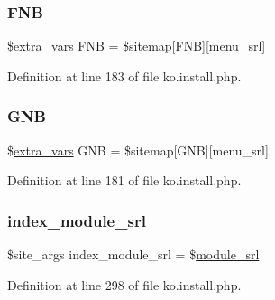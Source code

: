 \subsubsection{\texorpdfstring{F\+NB}{FNB}}
{\footnotesize\ttfamily \$\hyperlink{ko_8install_8php_ae1dcb37fc34a8f312d2e6abd6f806743}{extra\+\_\+vars} F\+NB = \$sitemap\mbox{[}\textquotesingle{}F\+NB\textquotesingle{}\mbox{]}\mbox{[}\textquotesingle{}menu\+\_\+srl\textquotesingle{}\mbox{]}}



Definition at line 183 of file ko.\+install.\+php.

\mbox{\label{ko_8install_8php_a9b1716b68fc04f3492448f38148dcbf5}} 
\subsubsection{\texorpdfstring{G\+NB}{GNB}}
{\footnotesize\ttfamily \$\hyperlink{ko_8install_8php_ae1dcb37fc34a8f312d2e6abd6f806743}{extra\+\_\+vars} G\+NB = \$sitemap\mbox{[}\textquotesingle{}G\+NB\textquotesingle{}\mbox{]}\mbox{[}\textquotesingle{}menu\+\_\+srl\textquotesingle{}\mbox{]}}



Definition at line 181 of file ko.\+install.\+php.

\mbox{\label{ko_8install_8php_acd0b17bfe6d14c82871d73fa39c9c22d}} 
\subsubsection{\texorpdfstring{index\+\_\+module\+\_\+srl}{index\_module\_srl}}
{\footnotesize\ttfamily \$site\+\_\+args index\+\_\+module\+\_\+srl = \$\hyperlink{ko_8install_8php_a370bb6450fab1da3e0ed9f484a38b761}{module\+\_\+srl}}



Definition at line 298 of file ko.\+install.\+php.

\mbox{\label{ko_8install_8php_a0dc2cdff7167f362443808ff71ae5177}} 

